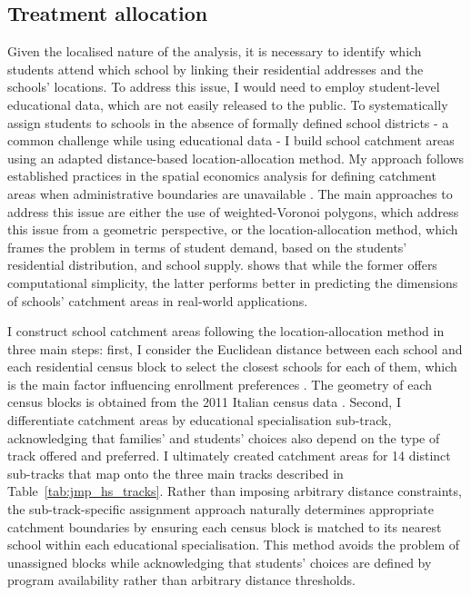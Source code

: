 \documentclass[12pt]{article}
\theoremstyle{plain}
\theoremstyle{plain}
\theoremstyle{plain}
\theoremstyle{definition}
\theoremstyle{plain}
\theoremstyle{definition}
\theoremstyle{plain}
\theoremstyle{remark}
\theoremstyle{definition}
\theoremstyle{definition}
\theoremstyle{plain}
\begin{document}
\FloatBarrier
\subsection{Treatment allocation}
\vspace{-0.19cm}
\label{sec:jmp_treatment}
Given the localised nature of the analysis, it is necessary to identify which students attend which school by linking their residential addresses and the schools' locations. To address this issue, I would need to employ student-level educational data, which are not easily released to the public. To systematically assign students to schools in the absence of formally defined school districts - a common challenge while using educational data - I build school catchment areas using an adapted distance-based location-allocation method. My approach follows established practices in the spatial economics analysis for defining catchment areas when administrative boundaries are unavailable \citep{pearce_techniques_2000, singleton_estimating_2011}. The main approaches to address this issue are either the use of weighted-Voronoi polygons, which address this issue from a geometric perspective, or the location-allocation method, which frames the problem in terms of student demand, based on the students' residential distribution, and school supply. \citet{pearce_techniques_2000} shows that while the former offers computational simplicity, the latter performs better in predicting the dimensions of schools' catchment areas in real-world applications. \par
I construct school catchment areas following the location-allocation method in three main steps: first, I consider the Euclidean distance between each school and each residential census block to select the closest schools for each of them, which is the main factor influencing enrollment preferences \citep{mandic_enrolling_2017}. The geometry of each census blocks is obtained from the 2011 Italian census data \citep{istat_censimento_2011}. Second, I differentiate catchment areas by educational specialisation sub-track, acknowledging that families' and students' choices also depend on the type of track offered and preferred. I ultimately created catchment areas for 14 distinct sub-tracks that map onto the three main tracks described in Table~\ref{tab:jmp_hs_tracks}. Rather than imposing arbitrary distance constraints, the sub-track-specific assignment approach naturally determines appropriate catchment boundaries by ensuring each census block is matched to its nearest school within each educational specialisation. This method avoids the problem of unassigned blocks while acknowledging that students' choices are defined by program availability rather than arbitrary distance thresholds. 
\end{document}
